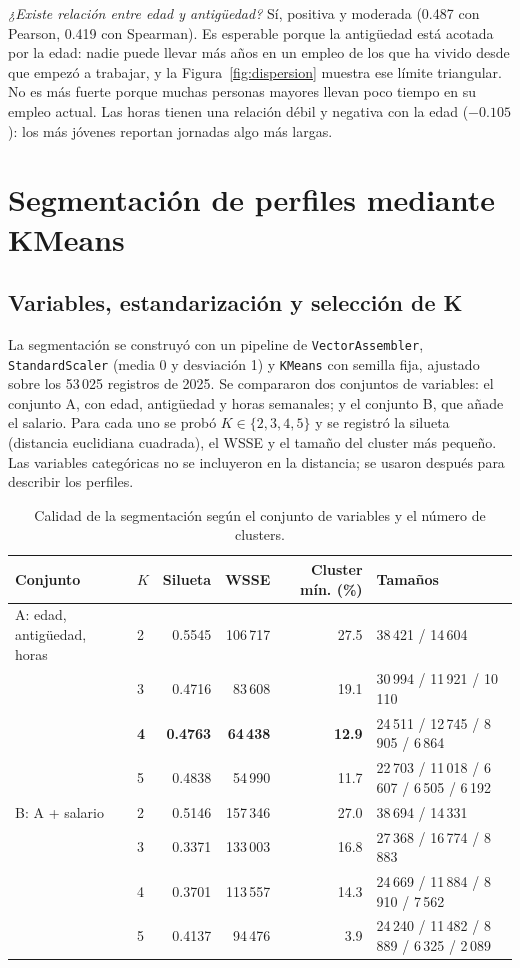 \documentclass[11pt,a4paper]{article}
\newcommand{\var}[1]{\texttt{#1}}
\begin{document}
\textit{¿Existe relación entre edad y antigüedad?} Sí, positiva y moderada (0.487 con Pearson, 0.419 con Spearman). Es esperable porque la antigüedad está acotada por la edad: nadie puede llevar más años en un empleo de los que ha vivido desde que empezó a trabajar, y la Figura~\ref{fig:dispersion} muestra ese límite triangular. No es más fuerte porque muchas personas mayores llevan poco tiempo en su empleo actual. Las horas tienen una relación débil y negativa con la edad ($-0.105$): los más jóvenes reportan jornadas algo más largas.

\section{Segmentación de perfiles mediante KMeans}

\subsection{Variables, estandarización y selección de K}

La segmentación se construyó con un pipeline de \var{VectorAssembler}, \var{StandardScaler} (media 0 y desviación 1) y \var{KMeans} con semilla fija, ajustado sobre los 53\,025 registros de 2025. Se compararon dos conjuntos de variables: el conjunto A, con edad, antigüedad y horas semanales; y el conjunto B, que añade el salario. Para cada uno se probó $K \in \{2, 3, 4, 5\}$ y se registró la silueta (distancia euclidiana cuadrada), el WSSE y el tamaño del cluster más pequeño. Las variables categóricas no se incluyeron en la distancia; se usaron después para describir los perfiles.

\begin{table}[H]
\centering
\caption{Calidad de la segmentación según el conjunto de variables y el número de clusters.}
\label{tab:kmeans}
\footnotesize\setlength{\tabcolsep}{4pt}
\begin{tabular}{llrrrl}
\toprule
Conjunto & $K$ & Silueta & WSSE & Cluster mín. (\%) & Tamaños \\
\midrule
A: edad, antigüedad, horas & 2 & 0.5545 & 106\,717 & 27.5 & 38\,421 / 14\,604 \\
 & 3 & 0.4716 & 83\,608 & 19.1 & 30\,994 / 11\,921 / 10\,110 \\
 & \textbf{4} & \textbf{0.4763} & \textbf{64\,438} & \textbf{12.9} & 24\,511 / 12\,745 / 8\,905 / 6\,864 \\
 & 5 & 0.4838 & 54\,990 & 11.7 & 22\,703 / 11\,018 / 6\,607 / 6\,505 / 6\,192 \\
\midrule
B: A + salario & 2 & 0.5146 & 157\,346 & 27.0 & 38\,694 / 14\,331 \\
 & 3 & 0.3371 & 133\,003 & 16.8 & 27\,368 / 16\,774 / 8\,883 \\
 & 4 & 0.3701 & 113\,557 & 14.3 & 24\,669 / 11\,884 / 8\,910 / 7\,562 \\
 & 5 & 0.4137 & 94\,476 & 3.9 & 24\,240 / 11\,482 / 8\,889 / 6\,325 / 2\,089 \\
\bottomrule
\end{tabular}
\end{table}
\end{document}
